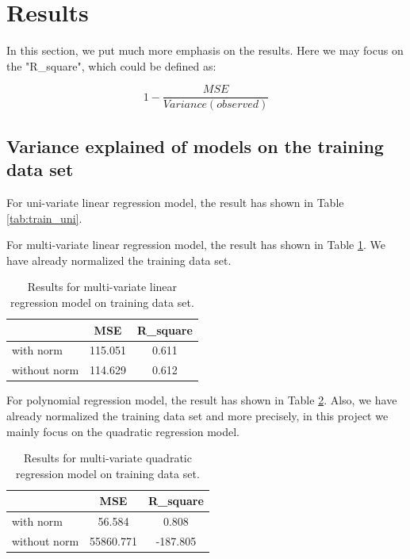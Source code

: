 \documentclass{article}
\begin{document}
\section{Results}
In this section, we put much more emphasis on the results. Here we may focus on the "R\_square", which could be defined as:

\begin{equation*}
  1 - \frac{MSE}{Variance(observed)}
\end{equation*}


\subsection{Variance explained of models on the training data set}

For uni-variate linear regression model, the result has shown in Table \ref{tab:train_uni}.



For multi-variate linear regression model, the result has shown in Table \ref{tab:train_multi}. We have already normalized the training data set.

\begin{table}[htbp]
\centering
\begin{tabular}{|l|c|c|}
\hline
         &  MSE & R\_square \\
\hline
with norm &  115.051  & 0.611 \\
\hline
without norm & 114.629 & 0.612 \\
\hline
\end{tabular}
\caption{\label{tab:train_multi}Results for multi-variate linear regression model on training data set.}
\end{table}





For polynomial regression model, the result has shown in Table \ref{tab:train_poly}. Also, we have already normalized the training data set and more precisely, in this project we mainly focus on the quadratic regression model.

\begin{table}[htbp]
\centering
\begin{tabular}{|l|c|c|}
\hline
         &  MSE & R\_square \\
\hline
with norm &  56.584  & 0.808 \\
\hline
without norm & 55860.771 & -187.805 \\
\hline
\end{tabular}
\caption{\label{tab:train_poly}Results for multi-variate quadratic regression model on training data set.}
\end{table}
\end{document}

